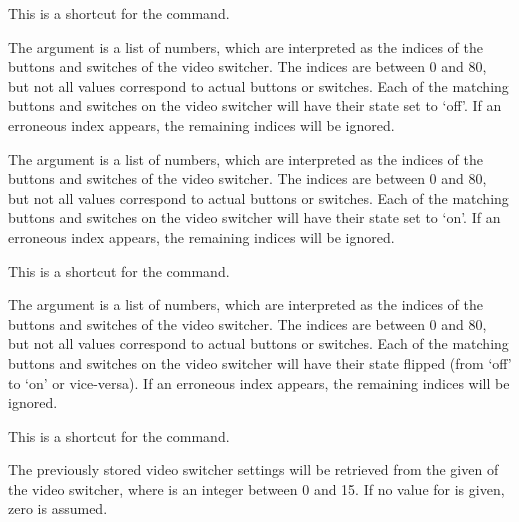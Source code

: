   This is a shortcut for the  command.

  The argument  is a list of numbers, which are interpreted as the indices of the
  buttons and switches of the video switcher.
  The indices are between 0 and 80, but not all values correspond to actual buttons or switches.
  Each of the matching buttons and switches on the video switcher will have their state set to `off'.
  If an erroneous index appears, the remaining indices will be ignored.

  The argument  is a list of numbers, which are interpreted as the indices of the
  buttons and switches of the video switcher.
  The indices are between 0 and 80, but not all values correspond to actual buttons or switches.
  Each of the matching buttons and switches on the video switcher will have their state set to `on'.
  If an erroneous index appears, the remaining indices will be ignored.

  This is a shortcut for the  command.

  The argument  is a list of numbers, which are interpreted as the indices of the
  buttons and switches of the video switcher.
  The indices are between 0 and 80, but not all values correspond to actual buttons or switches.
  Each of the matching buttons and switches on the video switcher will have their state flipped
  (from `off' to `on' or vice-versa).
  If an erroneous index appears, the remaining indices will be ignored.

  This is a shortcut for the  command.

  The previously stored video switcher settings will be retrieved from the given 
  of the video switcher, where  is an integer between 0 and 15.
  If no value for  is given, zero is assumed.

